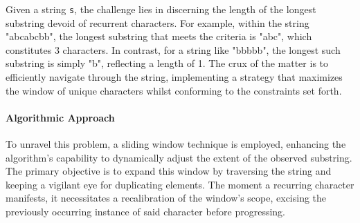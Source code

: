 Given a string \texttt{s}, the challenge lies in discerning the length of the longest substring devoid of recurrent characters. For example, within the string "abcabcbb", the longest substring that meets the criteria is "abc", which constitutes 3 characters. In contrast, for a string like "bbbbb", the longest such substring is simply "b", reflecting a length of 1. The crux of the matter is to efficiently navigate through the string, implementing a strategy that maximizes the window of unique characters whilst conforming to the constraints set forth.

\paragraph*{Algorithmic Approach}

To unravel this problem, a sliding window technique is employed, enhancing the algorithm's capability to dynamically adjust the extent of the observed substring. The primary objective is to expand this window by traversing the string and keeping a vigilant eye for duplicating elements. The moment a recurring character manifests, it necessitates a recalibration of the window's scope, excising the previously occurring instance of said character before progressing. 

